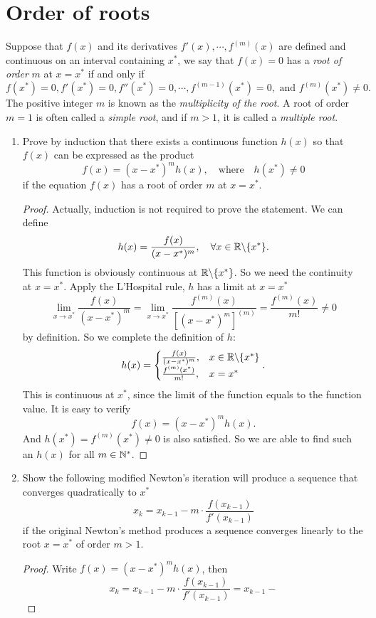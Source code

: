 \section{Order of roots}
Suppose that \(f(x)\) and its derivatives \(f'(x),\cdots, f^{(m)}(x)\) are defined and continuous on an interval containing $x^*$, we say that \(f(x)=0\) has a \emph{root of order} $m$ at \(x=x^*\) if and only if
\[ f(x^*)=0, f'(x^*)=0, f''(x^*)=0, \cdots, f^{(m-1)}(x^*)=0, \text{ and } f^{(m)}(x^*)\neq0. \]
The positive integer $m$ is known as the \emph{multiplicity of the root}.
A root of order \(m=1\) is often called a \emph{simple root}, and if \(m>1\), it is called a \emph{multiple root}.
\begin{enumerate}
	\item Prove by induction that there exists a continuous function \(h(x)\) so that \(f(x)\) can be expressed as the product
	\[ f(x)=(x-x^*)^m h(x), \quad \text{where} \quad h(x^*)\neq0 \]
	if the equation \(f(x)\) has a root of order $m$ at \(x=x^*\).
	\begin{proof}
		Actually, induction is not required to prove the statement.
		We can define
		\[ h(x)=\frac{f(x)}{(x-x^*)^m}, \quad \forall x\in\mathbb{R}\backslash\{x^*\}. \]
		This function is obviously continuous at \(\mathbb{R}\backslash\{x^*\}\).
		So we need the continuity at \(x=x^*\).
		Apply the L'Hospital rule, \(h\) has a limit at \(x=x^*\)
		\[ \lim_{x\to x^*}\frac{f(x)}{(x-x^*)^m}=\lim_{x\to x^*}\frac{f^{(m)}(x)}{\left[(x-x^*)^m\right]^{(m)}}		=\frac{f^{(m)}(x)}{m!}\neq0 \]
		by definition.
		So we complete the definition of \(h\):
		\[ h(x)=\begin{cases}
		\frac{f(x)}{(x-x^*)^m}, & x\in\mathbb{R}\backslash\{x^*\}\\
		\frac{f^{(m)}(x^*)}{m!}, & x=x^* \end{cases}. \]
		This is continuous at \(x^*\), since the limit of the function equals to the function value.
		It is easy to verify
		\[ f(x)=(x-x^*)^m h(x). \]
		And \(h(x^*)=f^{(m)}(x^*)\neq0\) is also satisfied.
		So we are able to find such an \(h(x)\) for all \(m\in\mathbb{N}^*\).
	\end{proof}
	\item Show the following modified Newton's iteration will produce a sequence that converges quadratically to $x^*$
	\[ x_k=x_{k-1}-m\cdot\frac{f(x_{k-1})}{f'(x_{k-1})} \]
	if the original Newton's method produces a sequence converges linearly to the root \(x=x^*\) of order \(m>1\).
	\begin{proof}
		Write \(f(x)=(x-x^*)^m h(x)\), then
		\[ x_{k} = x_{k-1} - m\cdot\frac{f(x_{k-1})}{f'(x_{k-1})} = x_{k-1} - 
\]
\end{proof}
\end{enumerate}
